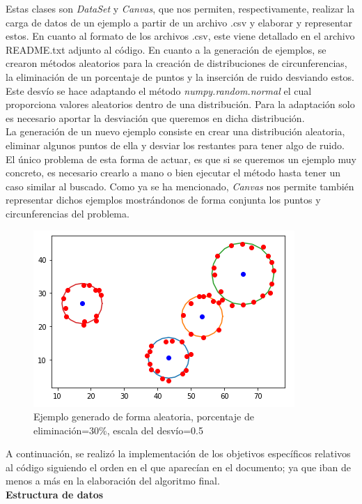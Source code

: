 \documentclass[conference,a4paper]{IEEEtran}
\begin{document}
Estas clases son \textit{DataSet} y  \textit{Canvas}, que nos permiten, respectivamente, realizar la carga de datos de un ejemplo a partir de un archivo .csv y elaborar y representar estos. En cuanto al formato de los archivos .csv, este viene detallado en el archivo README.txt adjunto al código. En cuanto a la generación de ejemplos, se crearon métodos aleatorios para la creación de distribuciones de circunferencias, la eliminación de un porcentaje de puntos y la inserción de ruido desviando estos. Este desvío se hace adaptando el método \textit{numpy.random.normal} el cual proporciona valores aleatorios dentro de una distribución. Para la adaptación solo es necesario aportar la desviación que queremos en dicha distribución.\\
La generación de un nuevo ejemplo consiste en crear una distribución aleatoria, eliminar algunos puntos de ella y desviar los restantes para tener algo de ruido. El único problema de esta forma de actuar, es que si se queremos un ejemplo muy concreto, es necesario crearlo a mano o bien ejecutar el método hasta tener un caso similar al buscado. Como ya se ha mencionado, \textit{Canvas} nos permite también representar dichos ejemplos mostrándonos de forma conjunta los puntos y circunferencias del problema.\\
\newpage
\begin{figure}[h]
\centering
\includegraphics[scale=0.8]{EjemploGenerado}
\caption{Ejemplo generado de forma aleatoria, porcentaje de eliminación=30\%, escala del desvío=0.5}
\end{figure}


A continuación, se realizó la implementación de los objetivos específicos relativos al código siguiendo el orden en el que aparecían en el documento; ya que iban de menos a más en la elaboración del algoritmo final.\\

\textbf{Estructura de datos}\\
\end{document}
